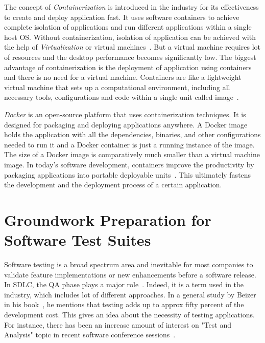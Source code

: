 The concept of \emph{Containerization} is introduced in the industry for its effectiveness to create and deploy application fast. It uses software containers to achieve complete isolation of applications and run different applications within a single host \ac{OS}. Without containerization, isolation of application can be achieved with the help of \emph{Virtualization} or virtual machines~\parencite{leszko2017continuous}. But a virtual machine requires lot of resources and the desktop performance becomes significantly low. The biggest advantage of containerization is the deployment of application using containers and there is no need for a virtual machine. Containers are like a lightweight virtual machine that sets up a computational environment, including all necessary tools, configurations and code within a single unit called image~\parencite{cito2016using}. 

\emph{Docker} is an open-source platform that uses containerization techniques. It is designed for packaging and deploying applications anywhere. A Docker image holds the application with all the dependencies, binaries, and other configurations needed to run it and a Docker container is just a running instance of the image. The size of a Docker image is comparatively much smaller than a virtual machine image.  In today’s software development, containers improve the productivity by packaging applications into portable deployable units~\parencite{benedicic2019sarus}. This ultimately fastens the development and the deployment process of a certain application.

\section{Groundwork Preparation for Software Test Suites}

Software testing is a broad spectrum area and inevitable for most companies to validate feature implementations or new enhancements before a software release. In \ac{SDLC}, the \ac{QA} phase plays a major role~\parencite{nidhra2012black}. Indeed, it is a term used in the industry, which includes lot of different approaches. In a general study by Beizer in his book~\parencite{beizer2003software}, he mentions that testing adds up to approx fifty percent of the development cost. This gives an idea about the necessity of testing applications. For instance, there has been an increase amount of interest on "Test and Analysis" topic in recent software conference sessions~\parencite{4221614}.

